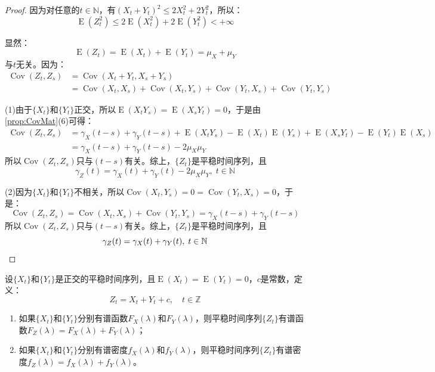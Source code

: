 \begin{proof}
	因为对任意的$t\in\mathbb{N}$，有$(X_t+Y_t)^2\leqslant2X_t^2+2Y_t^2$，所以：
	\begin{equation*}
		\operatorname{E}(Z_t^2)\leqslant2\operatorname{E}(X_t^2)+2\operatorname{E}(Y_t^2)<+\infty
	\end{equation*}\par
	显然：
	\begin{equation*}
		\operatorname{E}(Z_t)=\operatorname{E}(X_t)+\operatorname{E}(Y_t)=\mu_X+\mu_Y
	\end{equation*}
	与$t$无关。因为：
	\begin{align*}
		\operatorname{Cov}(Z_t,Z_s)
		&=\operatorname{Cov}(X_t+Y_t,X_s+Y_s) \\
		&=\operatorname{Cov}(X_t,X_s)+\operatorname{Cov}(X_t,Y_s)+\operatorname{Cov}(Y_t,X_s)+\operatorname{Cov}(Y_t,Y_s)
	\end{align*}\par
	(1)由于$\{X_t\}$和$\{Y_t\}$正交，所以$\operatorname{E}(X_tY_s)=\operatorname{E}(X_sY_t)=0$，于是由\cref{prop:CovMat}(6)可得：
	\begin{align*}
		\operatorname{Cov}(Z_t,Z_s)
		&=\gamma_X(t-s)+\gamma_Y(t-s)+\operatorname{E}(X_tY_s)-\operatorname{E}(X_t)\operatorname{E}(Y_s)+\operatorname{E}(X_sY_t)-\operatorname{E}(Y_t)\operatorname{E}(X_s) \\
		&=\gamma_X(t-s)+\gamma_Y(t-s)-2\mu_X\mu_Y
	\end{align*}
	所以$\operatorname{Cov}(Z_t,Z_s)$只与$(t-s)$有关。综上，$\{Z_t\}$是平稳时间序列，且
	\begin{equation*}
		\gamma_Z(t)=\gamma_X(t)+\gamma_Y(t)-2\mu_X\mu_Y,\;t\in\mathbb{N}
	\end{equation*}\par
	(2)因为$\{X_t\}$和$\{Y_t\}$不相关，所以$\operatorname{Cov}(X_t,Y_s)=0=\operatorname{Cov}(Y_t,X_s)=0$，于是：
	\begin{equation*}
		\operatorname{Cov}(Z_t,Z_s)=\operatorname{Cov}(X_t,X_s)+\operatorname{Cov}(Y_t,Y_s)=\gamma_X(t-s)+\gamma_Y(t-s)
	\end{equation*}
	所以$\operatorname{Cov}(Z_t,Z_s)$只与$(t-s)$有关。综上，$\{Z_t\}$是平稳时间序列，且
	\begin{equation*}
		\gamma_Z(t)=\gamma_X(t)+\gamma_Y(t),\;t\in\mathbb{N}\qedhere
	\end{equation*}
\end{proof}
\begin{theorem}
	设$\{X_t\}$和$\{Y_t\}$是正交的平稳时间序列，且$\operatorname{E}(X_t)=\operatorname{E}(Y_t)=0$，$c$是常数，定义：
	\begin{equation*}
		Z_t=X_t+Y_t+c,\quad t\in\mathbb{Z}
	\end{equation*}
	\begin{enumerate}
		\item 如果$\{X_t\}$和$\{Y_t\}$分别有谱函数$F_X(\lambda)$和$F_Y(\lambda)$，则平稳时间序列$\{Z_t\}$有谱函数$F_Z(\lambda)=F_X(\lambda)+F_Y(\lambda)$；
		\item 如果$\{X_t\}$和$\{Y_t\}$分别有谱密度$f_X(\lambda)$和$f_Y(\lambda)$，则平稳时间序列$\{Z_t\}$有谱密度$f_Z(\lambda)=f_X(\lambda)+f_Y(\lambda)$。
	\end{enumerate}
\end{theorem}
